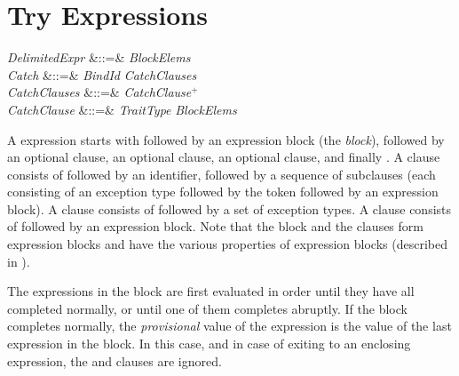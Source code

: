 %
%
%
%

\section{Try Expressions}


\begin{Grammar}
\emph{DelimitedExpr}
&::=&  \emph{BlockElems} 
  \\
\emph{Catch} &::=&  \emph{BindId} \emph{CatchClauses}\\

\emph{CatchClauses} &::=& \emph{CatchClause}$^+$\\

\emph{CatchClause} &::=& \emph{TraitType} \EXP{\Rightarrow} \emph{BlockElems} \\
\end{Grammar}


A  expression starts with 
followed by an expression block (the \emph{ block}),
followed by an optional  clause, an optional 
clause, an optional  clause, and finally
.  A  clause consists of
 followed by an identifier, followed by a sequence
of subclauses (each consisting of an exception type followed by the token
\EXP{\Rightarrow} followed by an expression block).
A  clause consists of 
followed by a set of exception types.
A  clause consists of 
followed by an expression block.
Note that the  block and the clauses
form expression blocks and have the various properties of
expression blocks (described in ).


The expressions in the  block are first evaluated in order
until they have all completed normally, or until one of them completes
abruptly.  If the  block completes normally, the
\emph{provisional} value of the  expression is the value of the
last expression in the  block.  In this case, and in case of
exiting to an enclosing  expression, the  and
 clauses are ignored.


